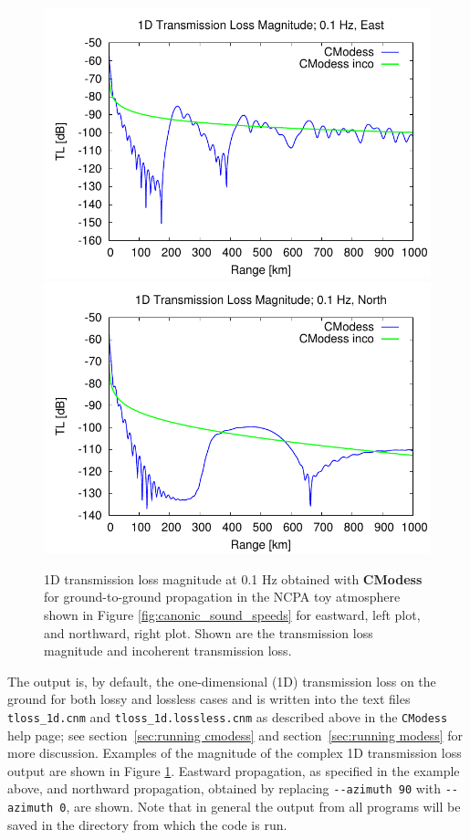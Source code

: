 \begin{figure}[h]
\begin{center}
\includegraphics[scale=0.45]{figs/cmodess_ex1} 
\includegraphics[scale=0.45]{figs/1D_cmodess_ex_N} 
\end{center}
\caption{1D transmission loss magnitude at 0.1 Hz obtained with {\bf CModess} for ground-to-ground propagation in the NCPA toy atmosphere shown in Figure \ref{fig:canonic_sound_speeds} for eastward, left plot, and northward, right plot. Shown are the transmission loss magnitude and incoherent transmission loss.}
\label{fig: cmodess 1D tl}
\end{figure}

The output is, by default, the one-dimensional (1D) transmission loss on the ground for both lossy and lossless cases and is written into the text files \verb+tloss_1d.cnm+ and \verb+tloss_1d.lossless.cnm+ as described above in the \verb+CModess+ help page; see section~\ref{sec:running cmodess} and section~\ref{sec:running modess} for more discussion. Examples of the magnitude of the complex 1D transmission loss output are shown in Figure \ref{fig: cmodess 1D tl}. Eastward propagation, as specified in the example above, and northward propagation, obtained by replacing \verb+--azimuth 90+ with  \verb+--azimuth 0+, are shown. Note that in general the output from all programs will be saved in the directory from which the code is run.  

